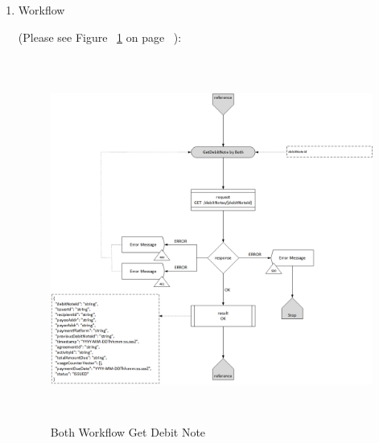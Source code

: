 \begin{enumerate}
\begin{table}
\begin{center}
\begin{tabular}{|p{3cm}|l|p{3cm}|p{3cm}|p{4cm}|}
\end{tabular}
\end{center}
\end{table}

\item Workflow

(Please see Figure ~\ref{fig:BGDN} on page ~\pageref{fig:BGDN}):

\begin{figure}[htbp]
    \centering
    \includegraphics[width=12cm,height=12cm,angle=0]{./diag/Workflow/Payment/GetDebitNote-B-Workflow.png}
    \caption{Both Workflow Get Debit Note }
	\label{fig:BGDN}
\end{figure}


\end{enumerate}

\newpage



